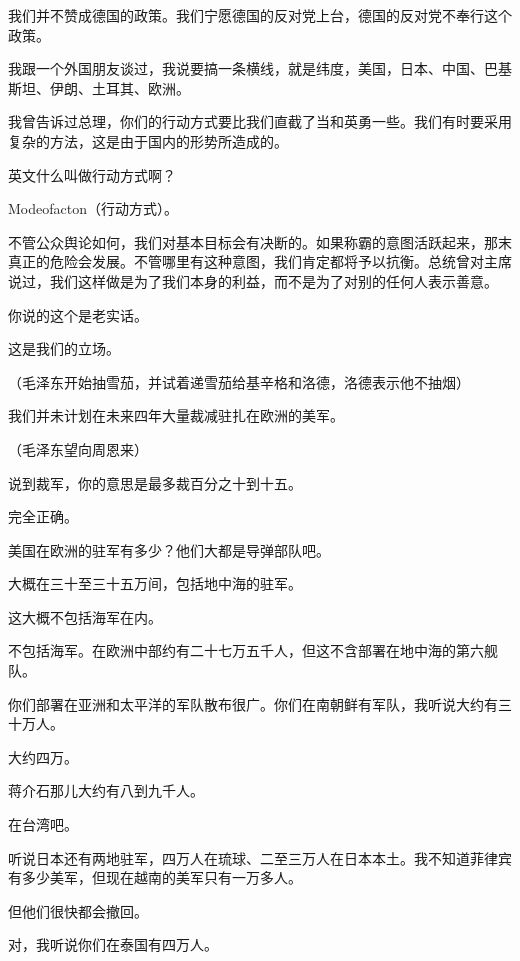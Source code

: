 我们并不赞成德国的政策。我们宁愿德国的反对党上台，德国的反对党不奉行这个政策。

我跟一个外国朋友谈过，我说要搞一条横线，就是纬度，美国，日本、中国、巴基斯坦、伊朗、土耳其、欧洲。

我曾告诉过总理，你们的行动方式要比我们直截了当和英勇一些。我们有时要采用复杂的方法，这是由于国内的形势所造成的。

英文什么叫做行动方式啊？

Modeofacton（行动方式）。

不管公众舆论如何，我们对基本目标会有决断的。如果称霸的意图活跃起来，那末真正的危险会发展。不管哪里有这种意图，我们肯定都将予以抗衡。总统曾对主席说过，我们这样做是为了我们本身的利益，而不是为了对别的任何人表示善意。

你说的这个是老实话。

这是我们的立场。

（毛泽东开始抽雪茄，并试着递雪茄给基辛格和洛德，洛德表示他不抽烟）

我们并未计划在未来四年大量裁减驻扎在欧洲的美军。

（毛泽东望向周恩来）

说到裁军，你的意思是最多裁百分之十到十五。

完全正确。

美国在欧洲的驻军有多少？他们大都是导弹部队吧。

大概在三十至三十五万间，包括地中海的驻军。

这大概不包括海军在内。

不包括海军。在欧洲中部约有二十七万五千人，但这不含部署在地中海的第六舰队。

你们部署在亚洲和太平洋的军队散布很广。你们在南朝鲜有军队，我听说大约有三十万人。

大约四万。

蒋介石那儿大约有八到九千人。

在台湾吧。

听说日本还有两地驻军，四万人在琉球、二至三万人在日本本土。我不知道菲律宾有多少美军，但现在越南的美军只有一万多人。

但他们很快都会撤回。

对，我听说你们在泰国有四万人。

